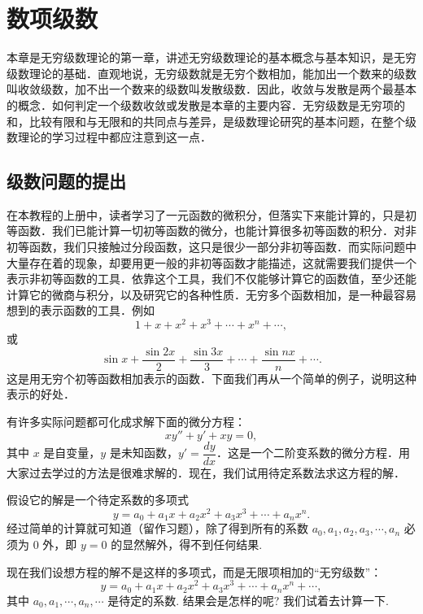 \chapter{数项级数}

本章是无穷级数理论的第一章，讲述无穷级数理论的基本概念与基本知识，是无穷级数理论的基础．直观地说，无穷级数就是无穷个数相加，能加出一个数来的级数叫收敛级数，加不出一个数来的级数叫发散级数．因此，收敛与发散是两个最基本的概念．如何判定一个级数收敛或发散是本章的主要内容．无穷级数是无穷项的和，比较有限和与无限和的共同点与差异，是级数理论研究的基本问题，在整个级数理论的学习过程中都应注意到这一点．

\section{级数问题的提出}

在本教程的上册中，读者学习了一元函数的微积分，但落实下来能计算的，只是初等函数．我们已能计算一切初等函数的微分，也能计算很多初等函数的积分．对非初等函数，我们只接触过分段函数，这只是很少一部分非初等函数．而实际问题中大量存在着的现象，却要用更一般的非初等函数才能描述，这就需要我们提供一个表示非初等函数的工具．依靠这个工具，我们不仅能够计算它的函数值，至少还能计算它的微商与积分，以及研究它的各种性质．无穷多个函数相加，是一种最容易想到的表示函数的工具．例如
\[
1+x+x^{2}+x^{3}+\cdots+x^{n}+\cdots,
\]
或
\[
\sin x+\frac{\sin 2x}{2}+\frac{\sin 3x}{3}+\cdots+\frac{\sin nx}{n}+\cdots.
\]
这是用无穷个初等函数相加表示的函数．下面我们再从一个简单的例子，说明这种表示的好处．

有许多实际问题都可化成求解下面的微分方程：
\[
xy''+y'+xy=0,
\]
其中 $x$ 是自变量，$y$ 是未知函数，$y'=\dfrac{dy}{dx}$．这是一个二阶变系数的微分方程．用大家过去学过的方法是很难求解的．现在，我们试用待定系数法求这方程的解．

假设它的解是一个待定系数的多项式
\[
y=a_{0}+a_{1}x+a_{2}x^{2}+a_{3}x^{3}+\cdots+a_{n}x^{n}.
\]
经过简单的计算就可知道（留作习题），除了得到所有的系数 $a_{0},a_{1},a_{2},a_{3},\cdots,a_{n}$ 必须为 $0$ 外，即 $y=0$ 的显然解外，得不到任何结果.

现在我们设想方程的解不是这样的多项式，而是无限项相加的``无穷级数''：
\[
y=a_{0}+a_{1}x+a_{2}x^{2}+a_{3}x^{3}+\cdots+a_{n}x^{n}+\cdots,
\]
其中 $a_{0},a_{1},\cdots,a_{n},\cdots$ 是待定的系数. 结果会是怎样的呢? 我们试着去计算一下.

